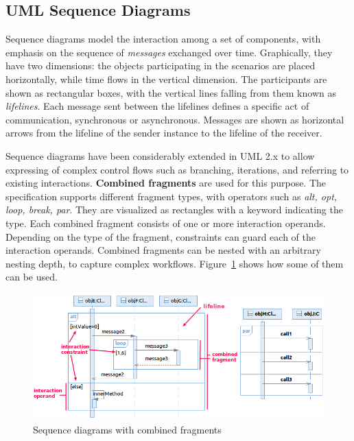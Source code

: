 \documentclass[letter]{llncs}
\begin{document}
\subsection{UML Sequence Diagrams}

Sequence diagrams model the interaction among a set of components, with
emphasis on the sequence of \emph{messages} exchanged over time. Graphically, they have
two dimensions: the objects participating in the scenarios are placed horizontally, 
while time flows in the vertical dimension. The participants are shown as rectangular boxes, with the vertical lines
falling from them known as \emph{lifelines}. 
Each message sent between the lifelines defines a specific act of communication, synchronous or asynchronous.
Messages are shown as horizontal arrows from the lifeline of the sender instance to the lifeline of the receiver. 

Sequence diagrams have been considerably extended in UML 2.x to allow expressing of complex control 
flows such as branching, iterations, and referring to existing interactions.
\textbf{Combined fragments} are used for this purpose. The specification
supports different fragment types, with operators such as \emph{alt, opt, loop, break, par}. They are
visualized as rectangles with a keyword indicating the type.
Each combined fragment consists of one or more interaction operands. Depending
on the type of the fragment, constraints can guard each of the interaction operands. 
Combined fragments can be nested with an arbitrary nesting
depth, to capture complex workflows. Figure~\ref{fig:SDExample} shows how some of them can be
used. 
\begin{figure}[!t]
\centering
\includegraphics[width=1.0\linewidth,keepaspectratio=true]{./Figure2_merged.png}
\caption{Sequence diagrams with combined fragments}
\label{fig:SDExample}
\end{figure}
\end{document}
